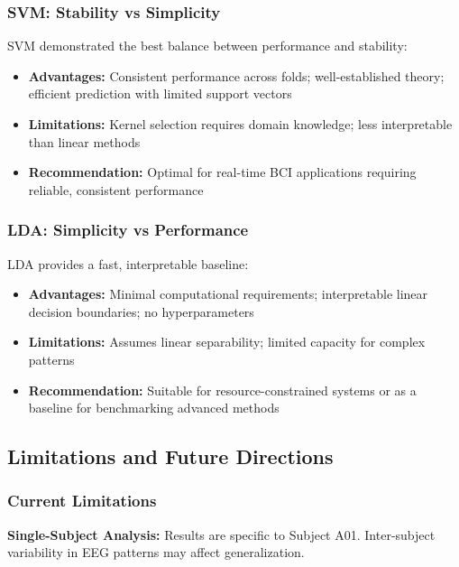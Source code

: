 \documentclass[11pt]{article}
\begin{document}
\subsubsection{SVM: Stability vs Simplicity}

SVM demonstrated the best balance between performance and stability:

\begin{itemize}
    \item \textbf{Advantages:} Consistent performance across folds; well-established theory; efficient prediction with limited support vectors
    \item \textbf{Limitations:} Kernel selection requires domain knowledge; less interpretable than linear methods
    \item \textbf{Recommendation:} Optimal for real-time BCI applications requiring reliable, consistent performance
\end{itemize}

\subsubsection{LDA: Simplicity vs Performance}

LDA provides a fast, interpretable baseline:

\begin{itemize}
    \item \textbf{Advantages:} Minimal computational requirements; interpretable linear decision boundaries; no hyperparameters
    \item \textbf{Limitations:} Assumes linear separability; limited capacity for complex patterns
    \item \textbf{Recommendation:} Suitable for resource-constrained systems or as a baseline for benchmarking advanced methods
\end{itemize}

\subsection{Limitations and Future Directions}

\subsubsection{Current Limitations}

\textbf{Single-Subject Analysis:} Results are specific to Subject A01. Inter-subject variability in EEG patterns may affect generalization.
\end{document}
